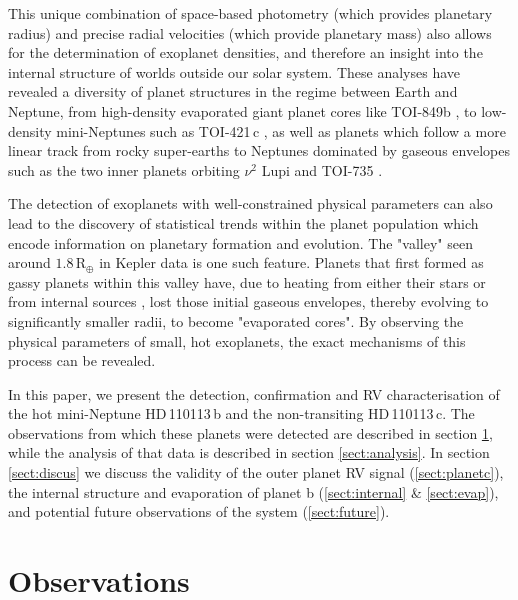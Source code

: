 \documentclass[fleqn,usenatbib]{mnras}
\newcommand{\gcm}{g\,cm$^{-3}$}	%
\newcommand{\rearth}{R$_{\oplus}$}
\newcommand{\Tplanet}{HD\,110113\,b}
\newcommand{\Tplanetc}{HD\,110113\,c}
\begin{document}
This unique combination of space-based photometry (which provides planetary radius) and precise radial velocities (which provide planetary mass) also allows for the determination of exoplanet densities, and therefore an insight into the internal structure of worlds outside our solar system.
These analyses have revealed a diversity of planet structures in the regime between Earth and Neptune, from high-density evaporated giant planet cores like TOI-849b \citep[5.2\,\gcm{}][]{armstrong2020remnant}, to low-density mini-Neptunes such as TOI-421\,c \citep{carleo2020multi}, as well as planets which follow a more linear track from rocky super-earths to Neptunes dominated by gaseous envelopes such as the two inner planets orbiting $\nu^2$ Lupi \citep{kane2020transits} and TOI-735 \citet{cloutier2020pair,nowak2020carmenes}.

The detection of exoplanets with well-constrained physical parameters can also lead to the discovery of statistical trends within the planet population which encode information on planetary formation and evolution.
The "valley" seen around $1.8$\,\rearth{} in Kepler data \citep{fulton2017california, van2018asteroseismic} is one such feature.
Planets that first formed as gassy planets within this valley have, due to heating from either their stars \citep[e.g. evaporation,][]{owen2017evaporation} or from internal sources \citep[e.g. core-powered mass loss,][]{ginzburg2018core}, lost those initial gaseous envelopes, thereby evolving to significantly smaller radii, to become "evaporated cores".
By observing the physical parameters of small, hot exoplanets, the exact mechanisms of this process can be revealed.

In this paper, we present the detection, confirmation and RV characterisation of the hot mini-Neptune \Tplanet{} and the non-transiting \Tplanetc{}. 
The observations from which these planets were detected are described in section \ref{sect:observations}, while the analysis of that data is described in section \ref{sect:analysis}.
In section \ref{sect:discus} we discuss the validity of the outer planet RV signal (\ref{sect:planetc}), the internal structure and evaporation of planet b (\ref{sect:internal} \& \ref{sect:evap}), and potential future observations of the system (\ref{sect:future}).

\section{Observations}
\label{sect:observations}
\end{document}
